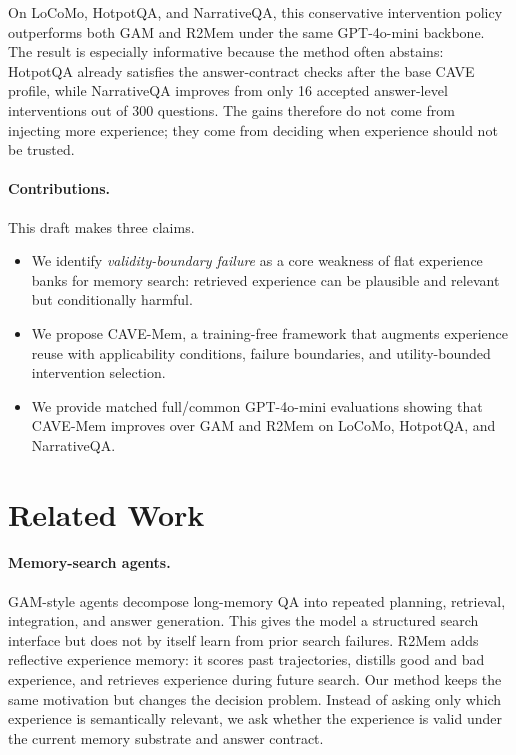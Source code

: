 \documentclass[11pt]{article}
\newcommand{\method}{CAVE-Mem}
\begin{document}
On LoCoMo, HotpotQA, and NarrativeQA, this conservative intervention policy
outperforms both GAM and R2Mem under the same GPT-4o-mini backbone. The result
is especially informative because the method often abstains: HotpotQA already
satisfies the answer-contract checks after the base CAVE profile, while
NarrativeQA improves from only 16 accepted answer-level interventions out of
300 questions. The gains therefore do not come from injecting more experience;
they come from deciding when experience should not be trusted.

\paragraph{Contributions.}
This draft makes three claims.

\begin{itemize}[leftmargin=*]
  \item We identify \emph{validity-boundary failure} as a core weakness of
  flat experience banks for memory search: retrieved experience can be
  plausible and relevant but conditionally harmful.
  \item We propose \method{}, a training-free framework that augments
  experience reuse with applicability conditions, failure boundaries, and
  utility-bounded intervention selection.
  \item We provide matched full/common GPT-4o-mini evaluations showing that
  \method{} improves over GAM and R2Mem on LoCoMo, HotpotQA, and NarrativeQA.
\end{itemize}

\section{Related Work}

\paragraph{Memory-search agents.}
GAM-style agents decompose long-memory QA into repeated planning, retrieval,
integration, and answer generation. This gives the model a structured search
interface but does not by itself learn from prior search failures. R2Mem adds
reflective experience memory: it scores past trajectories, distills good and
bad experience, and retrieves experience during future search. Our method keeps
the same motivation but changes the decision problem. Instead of asking only
which experience is semantically relevant, we ask whether the experience is
valid under the current memory substrate and answer contract.
\end{document}

